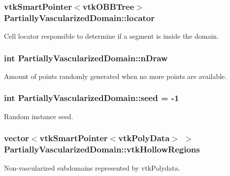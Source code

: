 \subsubsection[{\texorpdfstring{locator}{locator}}]{\setlength{\rightskip}{0pt plus 5cm}vtk\+Smart\+Pointer$<$vtk\+O\+B\+B\+Tree$>$ Partially\+Vascularized\+Domain\+::locator\hspace{0.3cm}{\ttfamily [private]}}\hypertarget{class_partially_vascularized_domain_a3e4d13820b8ed9beea9bf9d3bfc807a2}{}\label{class_partially_vascularized_domain_a3e4d13820b8ed9beea9bf9d3bfc807a2}
Cell locator responsible to determine if a segment is inside the domain. 
\subsubsection[{\texorpdfstring{n\+Draw}{nDraw}}]{\setlength{\rightskip}{0pt plus 5cm}int Partially\+Vascularized\+Domain\+::n\+Draw\hspace{0.3cm}{\ttfamily [private]}}\hypertarget{class_partially_vascularized_domain_ae88320ec5cef5465ad2c74ce201d5131}{}\label{class_partially_vascularized_domain_ae88320ec5cef5465ad2c74ce201d5131}
Amount of points randomly generated when no more points are available. 
\subsubsection[{\texorpdfstring{seed}{seed}}]{\setlength{\rightskip}{0pt plus 5cm}int Partially\+Vascularized\+Domain\+::seed = -\/1\hspace{0.3cm}{\ttfamily [private]}}\hypertarget{class_partially_vascularized_domain_a443b5b60ce756ea5bfb05c628ed4af0d}{}\label{class_partially_vascularized_domain_a443b5b60ce756ea5bfb05c628ed4af0d}
Random instance seed. 
\subsubsection[{\texorpdfstring{vtk\+Hollow\+Regions}{vtkHollowRegions}}]{\setlength{\rightskip}{0pt plus 5cm}vector$<$vtk\+Smart\+Pointer$<$vtk\+Poly\+Data$>$ $>$ Partially\+Vascularized\+Domain\+::vtk\+Hollow\+Regions\hspace{0.3cm}{\ttfamily [private]}}\hypertarget{class_partially_vascularized_domain_a725b3a41a8c28011def02f193121b99b}{}\label{class_partially_vascularized_domain_a725b3a41a8c28011def02f193121b99b}
Non-\/vascularized subdomains represented by vtk\+Polydata. 
